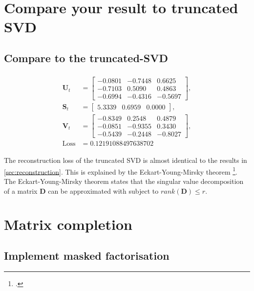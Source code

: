 \documentclass[10pt, twocolumn]{article}
\begin{document}
\section{Compare your result to truncated SVD}

\subsection{Compare to the truncated-SVD}

\begin{align*}
    \begin{split}
    \pmb{U}_t &=
    \begin{bmatrix}
        -0.0801 & -0.7448 &  0.6625\\
        -0.7103 &  0.5090 &  0.4863\\
        -0.6994 & -0.4316 & -0.5697
    \end{bmatrix},\\
    \pmb{S}_t &=
    \begin{bmatrix}
        5.3339 & 0.6959 & 0.0000
    \end{bmatrix},\\
    \pmb{V}_t &=
    \begin{bmatrix}
        -0.8349 &  0.2548 &  0.4879\\
        -0.0851 & -0.9355 &  0.3430\\
        -0.5439 & -0.2448 & -0.8027
    \end{bmatrix},\\
    \text{Loss} &= 0.12191088497638702
    \end{split}
\end{align*}

The reconstruction loss of the truncated SVD is almost identical to the results in \cref{sec:reconstruction}. This is explained by the Eckart-Young-Mirsky theorem \footcite{eckart_approximation_1936}. The Eckart-Young-Mirsky theorem states that the singular value decomposition of a matrix $\pmb{D}$ can be approximated with subject to $rank(\pmb{D}) \leq r$. 

\section{Matrix completion}

\subsection{Implement masked factorisation}
\end{document}
